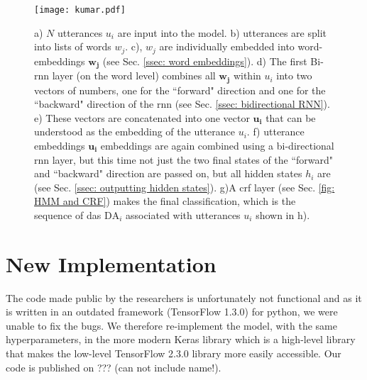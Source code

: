     \begin{figure}
        \centering
        \texttt{[image: kumar.pdf]}
        \caption{a) $N$ \glspl{utterance} $u_i$ are input into the \gls{model}. \newline 
        b) \Glspl{utterance} are split into lists of words $w_j$. \newline 
        c), $w_j$ are individually embedded into word-\glspl{embedding} $\mathbf{w_j}$ (see Sec. \ref{ssec: word embeddings}).\newline 
        d) The first Bi-\gls{rnn} layer (on the word level) combines all $\mathbf{w_j}$ within $u_i$ into two vectors of numbers, one for the ``forward" direction and one for the ``backward" direction of the \gls{rnn} (see Sec. \ref{ssec: bidirectional RNN}).\newline 
        e) These vectors are concatenated into one vector $\mathbf{u_i}$ that can be understood as the \gls{embedding} of the \gls{utterance} $u_i$.\newline 
        f) \Gls{utterance} \glspl{embedding} $\mathbf{u_i}$ \glspl{embedding} are again combined using a bi-directional \gls{rnn} layer, but this time not just the two final states of the ``forward" and ``backward" direction are passed on, but all hidden states $h_i$ are (see Sec. \ref{ssec: outputting hidden states}).\newline 
        g)A \gls{crf} layer (see Sec. \ref{fig: HMM and CRF}) makes the final classification, which is the sequence of \glspl{da} $\text{DA}_i$ associated with \glspl{utterance} $u_i$ shown in h).}
        \label{fig:kumar_model}
    \end{figure}

    \section{New Implementation}
        The code made public by the researchers is unfortunately not functional and as it is written in an outdated framework (TensorFlow 1.3.0\cite{tensorflow2015-whitepaper}) for python, we were unable to fix the bugs. We therefore re-implement the \gls{model}, with the same hyperparameters, in the more modern Keras library\cite{chollet2015keras} which is a high-level library that makes the low-level TensorFlow 2.3.0 library more easily accessible. Our code is published on ??? (can not include name!).


